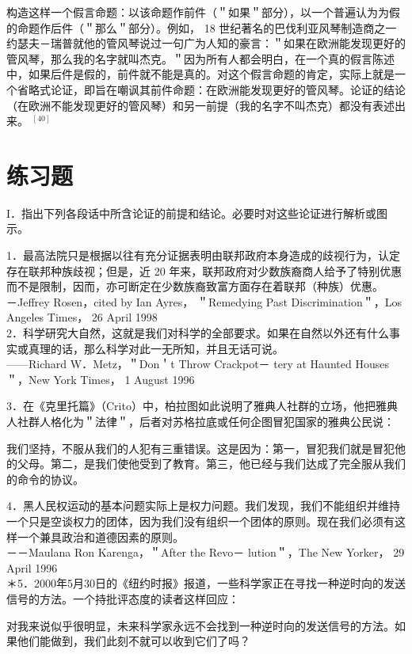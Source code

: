 构造这样一个假言命题：以该命题作前件（＂如果＂部分），以一个普遍认为为假的命题作后件（＂那么＂部分）。例如， 18 世纪著名的巴伐利亚风琴制造商之一约瑟夫－瑞普就他的管风琴说过一句广为人知的豪言：＂如果在欧洲能发现更好的管风琴，那么我的名字就叫杰克。＂因为所有人都会明白，在一个真的假言陈述中，如果后件是假的，前件就不能是真的。对这个假言命题的肯定，实际上就是一个省略式论证，即旨在嘲讽其前件命题：在欧洲能发现更好的管风琴。论证的结论（在欧洲不能发现更好的管风琴）和另一前提（我的名字不叫杰克）都没有表述出来。 ${ }^{[40]}$

\section*{练习题}
I．指出下列各段话中所含论证的前提和结论。必要时对这些论证进行解析或图示。

1．最高法院只是根据以往有充分证据表明由联邦政府本身造成的歧视行为，认定存在联邦种族歧视；但是，近 20 年来，联邦政府对少数族裔商人给予了特别优惠而不是限制，因而，亦可断定在少数族裔致富方面存在着联邦（种族）优惠。\\
－Jeffrey Rosen，cited by Ian Ayres， ＂Remedying Past Discrimination＂，Los Angeles Times， 26 April 1998\\
2．科学研究大自然，这就是我们对科学的全部要求。如果在自然以外还有什么事实或真理的话，那么科学对此一无所知，并且无话可说。\\
——Richard W．Metz，＂Don＇t Throw Crackpot－ tery at Haunted Houses＂，New York Times， 1 August 1996

3．在《克里托篇》（Crito）中，柏拉图如此说明了雅典人社群的立场，他把雅典人社群人格化为＂法律＂，后者对苏格拉底或任何企图冒犯国家的雅典公民说：

我们坚持，不服从我们的人犯有三重错误。这是因为：第一，冒犯我们就是冒犯他的父母。第二，是我们使他受到了教育。第三，他已经与我们达成了完全服从我们的命令的协议。

4．黑人民权运动的基本问题实际上是权力问题。我们发现，我们不能组织并维持一个只是空谈权力的团体，因为我们没有组织一个团体的原则。现在我们必须有这样一个兼具政治和道德因素的原则。\\
－－Maulana Ron Karenga，＂After the Revo－ lution＂，The New Yorker， 29 April 1996\\
＊5．2000年5月30日的《纽约时报》报道，一些科学家正在寻找一种逆时向的发送信号的方法。一个持批评态度的读者这样回应：

\begin{displayquote}
对我来说似乎很明显，未来科学家永远不会找到一种逆时向的发送信号的方法。如果他们能做到，我们此刻不就可以收到它们了吗？
\end{displayquote}

